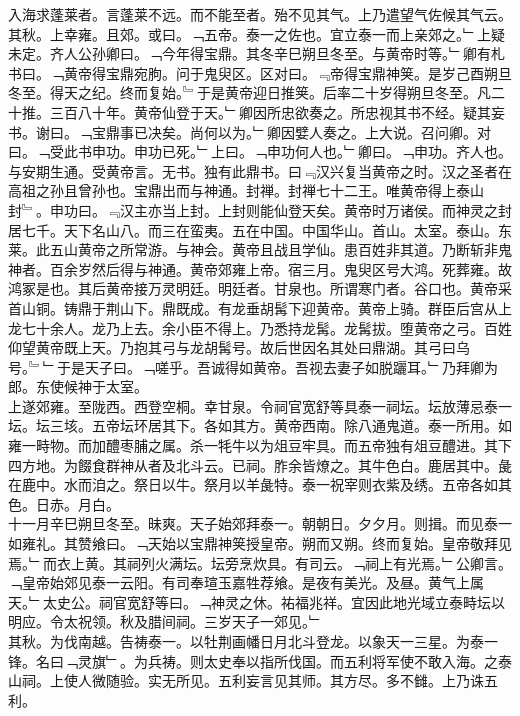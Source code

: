 \documentclass{zhvt-classic}
\begin{document}
\hspace*{2em}入海求蓬莱者。言蓬莱不远。而不能至者。殆不见其气。上乃遣望气佐候其气云。\\
\hspace*{2em}其秋。上幸雍。且郊。或曰。﹁五帝。泰一之佐也。宜立泰一而上亲郊之。﹂上疑未定。齐人公孙卿曰。﹁今年得宝鼎。其冬辛巳朔旦冬至。与黄帝时等。﹂卿有札书曰。﹁黄帝得宝鼎宛朐。问于鬼臾区。区对曰。﹃帝得宝鼎神䇲。是岁己酉朔旦冬至。得天之纪。终而复始。﹄于是黄帝迎日推䇲。后率二十岁得朔旦冬至。凡二十推。三百八十年。黄帝仙登于天。﹂卿因所忠欲奏之。所忠视其书不经。疑其妄书。谢曰。﹁宝鼎事已决矣。尚何以为。﹂卿因嬖人奏之。上大说。召问卿。对曰。﹁受此书申功。申功已死。﹂上曰。﹁申功何人也。﹂卿曰。﹁申功。齐人也。与安期生通。受黄帝言。无书。独有此鼎书。曰﹃汉兴复当黄帝之时。汉之圣者在高祖之孙且曾孙也。宝鼎出而与神通。封禅。封禅七十二王。唯黄帝得上泰山封﹄。申功曰。﹃汉主亦当上封。上封则能仙登天矣。黄帝时万诸侯。而神灵之封居七千。天下名山八。而三在蛮夷。五在中国。中国华山。首山。太室。泰山。东莱。此五山黄帝之所常游。与神会。黄帝且战且学仙。患百姓非其道。乃断斩非鬼神者。百余岁然后得与神通。黄帝郊雍上帝。宿三月。鬼臾区号大鸿。死葬雍。故鸿冢是也。其后黄帝接万灵明廷。明廷者。甘泉也。所谓寒门者。谷口也。黄帝采首山铜。铸鼎于荆山下。鼎既成。有龙垂胡髯下迎黄帝。黄帝上骑。群臣后宫从上龙七十余人。龙乃上去。余小臣不得上。乃悉持龙髯。龙髯拔。堕黄帝之弓。百姓仰望黄帝既上天。乃抱其弓与龙胡髯号。故后世因名其处曰鼎湖。其弓曰乌号。﹄﹂于是天子曰。﹁嗟乎。吾诚得如黄帝。吾视去妻子如脱躧耳。﹂乃拜卿为郎。东使候神于太室。\\
\hspace*{2em}上遂郊雍。至陇西。西登空桐。幸甘泉。令祠官宽舒等具泰一祠坛。坛放薄忌泰一坛。坛三垓。五帝坛环居其下。各如其方。黄帝西南。除八通鬼道。泰一所用。如雍一畤物。而加醴枣脯之属。杀一牦牛以为俎豆牢具。而五帝独有俎豆醴进。其下四方地。为餟食群神从者及北斗云。已祠。胙余皆燎之。其牛色白。鹿居其中。彘在鹿中。水而洎之。祭日以牛。祭月以羊彘特。泰一祝宰则衣紫及绣。五帝各如其色。日赤。月白。\\
\hspace*{2em}十一月辛巳朔旦冬至。昧爽。天子始郊拜泰一。朝朝日。夕夕月。则揖。而见泰一如雍礼。其赞飨曰。﹁天始以宝鼎神䇲授皇帝。朔而又朔。终而复始。皇帝敬拜见焉。﹂而衣上黄。其祠列火满坛。坛旁烹炊具。有司云。﹁祠上有光焉。﹂公卿言。﹁皇帝始郊见泰一云阳。有司奉瑄玉嘉牲荐飨。是夜有美光。及昼。黄气上属天。﹂太史公。祠官宽舒等曰。﹁神灵之休。祐福兆祥。宜因此地光域立泰畤坛以明应。令太祝领。秋及腊间祠。三岁天子一郊见。﹂\\
\hspace*{2em}其秋。为伐南越。告祷泰一。以牡荆画幡日月北斗登龙。以象天一三星。为泰一锋。名曰﹁灵旗﹂。为兵祷。则太史奉以指所伐国。而五利将军使不敢入海。之泰山祠。上使人微随验。实无所见。五利妄言见其师。其方尽。多不雠。上乃诛五利。\\
\end{document}
